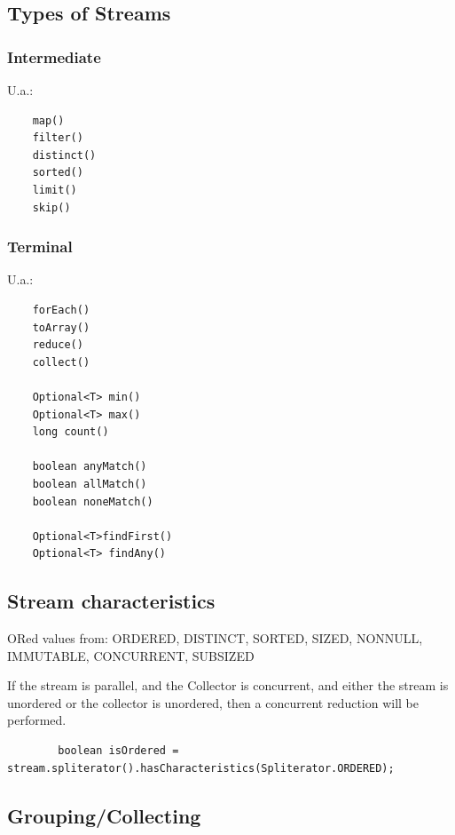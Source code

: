 \documentclass{scrartcl}
\begin{document}
\subsection{Types of Streams}

\subsubsection{Intermediate}

U.a.:

\begin{lstlisting}
    map()
    filter()
    distinct()
    sorted()
    limit()
    skip()
\end{lstlisting}

\subsubsection{Terminal}

U.a.:

\begin{lstlisting}
    forEach()
    toArray()
    reduce()
    collect()

    Optional<T> min()
    Optional<T> max()
    long count()

    boolean anyMatch()
    boolean allMatch()
    boolean noneMatch()

    Optional<T>findFirst()
    Optional<T> findAny()
\end{lstlisting}

\subsection{Stream characteristics}

    ORed values from: ORDERED, DISTINCT, SORTED, SIZED, NONNULL, IMMUTABLE, CONCURRENT, SUBSIZED

    If the stream is parallel, and the Collector is concurrent,
    and either the stream is unordered or the collector is unordered,
    then a concurrent reduction will be performed.

    \begin{lstlisting}
        boolean isOrdered = stream.spliterator().hasCharacteristics(Spliterator.ORDERED);
    \end{lstlisting}

\subsection{Grouping/Collecting}
\end{document}
